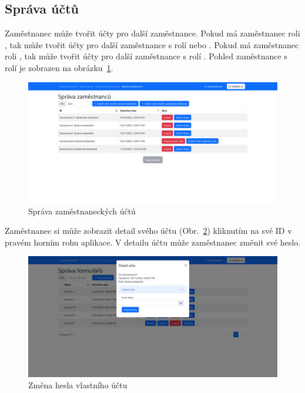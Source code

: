 \subsection{Správa účtů}\label{subsec:sprava-uctu}

Zaměstnanec může tvořit účty pro další zaměstnance.
Pokud má zaměstnanec roli , tak může tvořit účty pro další zaměstnance s rolí  nebo .
Pokud má zaměstnanec roli , tak může tvořit účty pro další zaměstnance s rolí .
Pohled zaměstnance s rolí  je zobrazen na obrázku~\ref{fig:sprava-zamestnancu-screenshot}.

\begin{figure}[H]
    \centering
    \includegraphics[width=\textwidth]{../img/screenshots/sprava-zamestnancu}
    \caption{Správa zaměstnaneckých účtů}\label{fig:sprava-zamestnancu-screenshot}
\end{figure}

Zaměstnanec si může zobrazit detail svého účtu (Obr.~\ref{fig:zmena-hesla-zamestnanec}) kliknutím na své ID v pravém horním rohu aplikace.
V detailu účtu může zaměstnanec změnit své heslo.

\begin{figure}[H]
    \centering
    \includegraphics[width=\textwidth]{../img/screenshots/zmena-hesla-zamestnanec}
    \caption{Změna hesla vlastního účtu}\label{fig:zmena-hesla-zamestnanec}
\end{figure}

